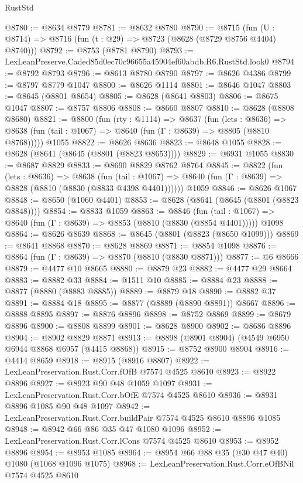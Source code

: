 \begin{lexlean}{RustStd}
\begin{coremodule}
@8780 := @8634 @8779
@8781 := @8632 @8780
@8790 := @8715 (fun (U : @8714) => @8716 (fun (t : @29) => @8723 (@8628 (@8729 @8756 @4404) @8740)))
@8792 := @8753 (@8781 @8790)
@8793 := LexLeanPreserve.Caded85d0ec70c96655a45904ef60abdb.R6.RustStd.look0
@8794 := @8792 @8793
@8796 := @8613 @8780 @8790
@8797 := @8626 @4386
@8799 := @8797 @8779 @1047
@8800 := @8626 @1114
@8801 := @8646 @1047
@8803 := @8645 (@8801 @8654)
@8805 := @8628 (@8641 @8803)
@8806 := @8675 @1047
@8807 := @8757 @8806
@8808 := @8660 @8807
@8810 := @8628 (@8808 @8680)
@8821 := @8800
    (fun (rty : @1114) =>
    @8637
      (fun (lets : @8636) =>
      @8638 (fun (tail : @1067) => @8640 (fun (Γ : @8639) => @8805 (@8810 @8768)))))
    @1055
@8822 := @8626 @8636
@8823 := @8648 @1055
@8828 := @8628 (@8641 (@8645 (@8801 (@8823 @8653))))
@8829 := @6931 @1055
@8830 := @8687 @8829
@8833 := @8690 @8829 @8762 @8764
@8845 := @8822
    (fun (lets : @8636) =>
    @8638
      (fun (tail : @1067) => @8640 (fun (Γ : @8639) => @8828 (@8810 (@8830 (@8833 @4398 @4401))))))
    @1059
@8846 := @8626 @1067
@8848 := @8650 (@1060 @4401)
@8853 := @8628 (@8641 (@8645 (@8801 (@8823 @8848))))
@8854 := @8833 @1059
@8863 := @8846
    (fun (tail : @1067) => @8640 (fun (Γ : @8639) => @8853 (@8810 (@8830 (@8854 @4401)))))
    @1098
@8864 := @8626 @8639
@8868 := @8645 (@8801 (@8823 (@8650 @1099)))
@8869 := @8641 @8868
@8870 := @8628 @8869
@8871 := @8854 @1098
@8876 := @8864 (fun (Γ : @8639) => @8870 (@8810 (@8830 @8871)))
@8877 := @6 @8666
@8879 := @4477 @10 @8665
@8880 := @8879 @23
@8882 := @4477 @29 @8664
@8883 := @8882 @33
@8884 := @1511 @10
@8885 := @8884 @23
@8888 := @8877 (@8880 (@8883 @8885))
@8889 := @8879 @18
@8890 := @8882 @37
@8891 := @8884 @18
@8895 := @8877 (@8889 (@8890 @8891)) @8667
@8896 := @8888 @8895
@8897 := @8876 @8896
@8898 := @8752 @8869
@8899 := @8679 @8896
@8900 := @8808 @8899
@8901 := @8628 @8900
@8902 := @8686 @8896
@8904 := @8902 @8829 @8871
@8913 := @8898 (@8901 @8904) (@4549 @6950 @6944 @8868 @6957 (@4415 @8868))
@8915 := @8752 @8900 @8904
@8916 := @4414 @8659
@8918 := @8915 (@8916 @8807)
@8922 := LexLeanPreservation.Rust.Corr.fOfB @7574 @4525 @8610
@8923 := @8922 @8896
@8927 := @8923 @90 @48 @1059 @1097
@8931 := LexLeanPreservation.Rust.Corr.bOfE @7574 @4525 @8610
@8936 := @8931 @8896 @1085 @90 @48 @1097
@8942 := LexLeanPreservation.Rust.Corr.buildPair @7574 @4525 @8610 @8896 @1085
@8948 := @8942 @66 @86 @35 @47 @1080 @1096
@8952 := LexLeanPreservation.Rust.Corr.lCons @7574 @4525 @8610
@8953 := @8952 @8896
@8954 := @8953 @1085
@8964 := @8954 @66 @88 @35 (@30 @47 @40) @1080 (@1068 @1096 @1075)
@8968 := LexLeanPreservation.Rust.Corr.eOfBNil @7574 @4525 @8610

\end{coremodule}
\end{lexlean}
